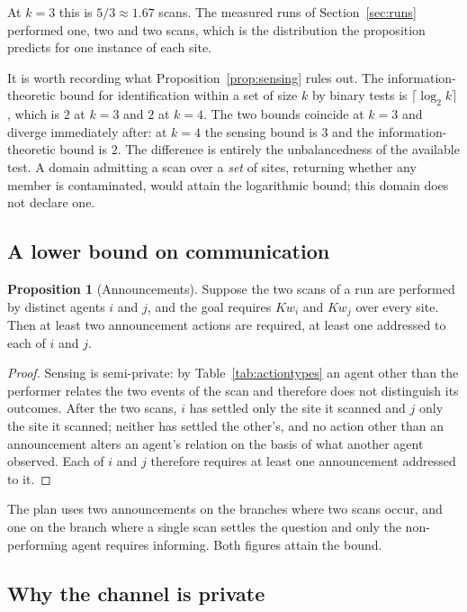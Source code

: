 \documentclass[11pt,a4paper]{article}
\theoremstyle{definition}
\newtheorem{proposition}{Proposition}
\newcommand{\Kw}[1]{\mathit{Kw}_{#1}}
\begin{document}
At $k = 3$ this is $5/3 \approx 1.67$ scans. The measured runs of
Section~\ref{sec:runs} performed one, two and two scans, which is the
distribution the proposition predicts for one instance of each site.

It is worth recording what Proposition~\ref{prop:sensing} rules out. The
information-theoretic bound for identification within a set of size $k$ by
binary tests is $\lceil \log_2 k \rceil$, which is $2$ at $k = 3$ and $2$ at
$k = 4$. The two bounds coincide at $k = 3$ and diverge immediately after: at
$k = 4$ the sensing bound is $3$ and the information-theoretic bound is $2$.
The difference is entirely the unbalancedness of the available test. A domain
admitting a scan over a \emph{set} of sites, returning whether any member is
contaminated, would attain the logarithmic bound; this domain does not declare
one.

\subsection{A lower bound on communication}

\begin{proposition}[Announcements]
\label{prop:announce}
Suppose the two scans of a run are performed by distinct agents $i$ and $j$,
and the goal requires $\Kw{i}$ and $\Kw{j}$ over every site. Then at least two
announcement actions are required, at least one addressed to each of $i$ and
$j$.
\end{proposition}

\begin{proof}
Sensing is semi-private: by Table~\ref{tab:actiontypes} an agent other than the
performer relates the two events of the scan and therefore does not
distinguish its outcomes. After the two scans, $i$ has settled only the site it
scanned and $j$ only the site it scanned; neither has settled the other's, and
no action other than an announcement alters an agent's relation on the basis of
what another agent observed. Each of $i$ and $j$ therefore requires at least
one announcement addressed to it.
\end{proof}

The plan uses two announcements on the branches where two scans occur, and one
on the branch where a single scan settles the question and only the
non-performing agent requires informing. Both figures attain the bound.

\subsection{Why the channel is private}
\end{document}
